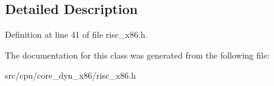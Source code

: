 \subsection{Detailed Description}


Definition at line 41 of file risc\-\_\-x86.\-h.



The documentation for this class was generated from the following file\-:\begin{DoxyCompactItemize}
\item 
src/cpu/core\-\_\-dyn\-\_\-x86/risc\-\_\-x86.\-h\end{DoxyCompactItemize}
